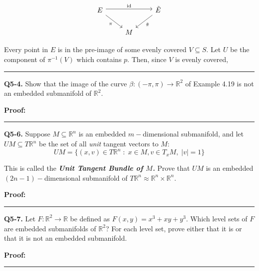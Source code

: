 \documentclass{article}
\newcommand{\R}{\mathbb{R}}
\begin{document}
\[\begin{tikzcd}
	E && {\tilde{E}} \\
	& M
	\arrow["{\mathrm{id}}", shift left, from=1-1, to=1-3]
	\arrow["{\tilde{\pi}}", from=1-3, to=2-2]
	\arrow["\pi"', from=1-1, to=2-2]
\end{tikzcd}\]

\vskip 0.5cm
Every point in $E$ is in the pre-image of some evenly covered $V \subseteq S$. Let $U$ be the component of $\pi^{-1}(V)$ which contains $p$. Then, since $V$ is evenly covered,

\vskip 0.5cm
\hrule 
\vskip 0.5cm




\textbf{Q5-4.} Show that the image of the curve $\beta : (-\pi, \pi) \rightarrow \R^2$ of Example 4.19 is not an embedded submanifold of $\R^2$. 

\vskip 0.5cm
\textbf{Proof:}


\vskip 0.5cm
\hrule 
\vskip 0.5cm




\textbf{Q5-6.} Suppose $M \subseteq \R^n$ is an embedded $m-$dimensional submanifold, and let $UM \subseteq T \R^n$ be the set of all \emph{unit} tangent vectors to $M$:
\[ UM = \{ (x, v) \in T \R^n \; : \; x\in M, v \in T_{x} M, \; \left| v \right| = 1 \} \]

This is called the \emph{\textbf{Unit Tangent Bundle of $M$.}} Prove that $UM$ is an embedded  $(2n-1)-$dimensional submanifold of $T \R^n \approx \R^n \times \R^{n}$.

\vskip 0.5cm
\textbf{Proof:}


\vskip 0.5cm
\hrule 
\vskip 0.5cm




\textbf{Q5-7.} Let $F : \R^2 \rightarrow \R$ be defined as $F(x,y) = x^3 + xy + y^3$. Which level sets of $F$ are embedded submanifolds of $\R^2$? For each level set, prove either that it is or that it is not an embedded submanifold. 

\vskip 0.5cm
\textbf{Proof:}


\vskip 0.5cm
\hrule 
\vskip 0.5cm









\end{document}
